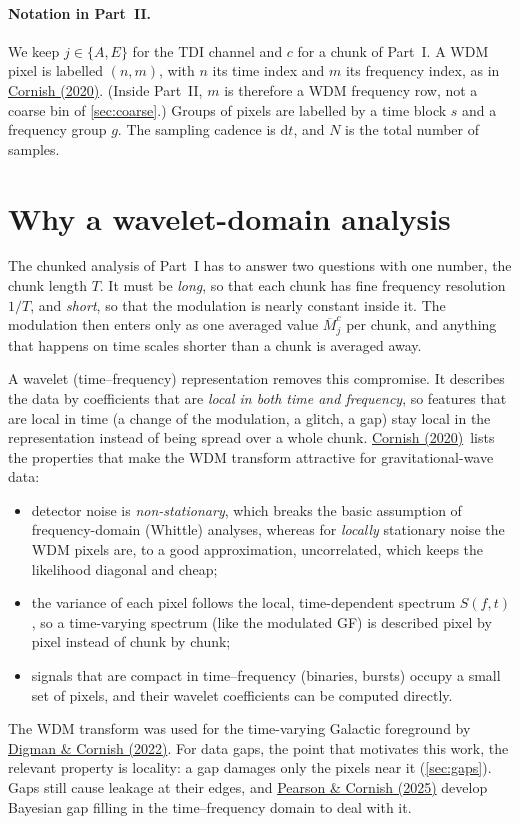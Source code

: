 \documentclass[11pt,a4paper]{article}
\newcommand{\urlCornish}{https://arxiv.org/abs/2009.00043}
\newcommand{\Cornish}{\href{\urlCornish}{Cornish (2020)}}
\newcommand{\dd}{\mathrm{d}}
\newcommand{\Mbar}{\overline{M}}
\begin{document}
\paragraph{Notation in Part~II.} We keep $j\in\{A,E\}$ for the TDI channel and $c$ for
a chunk of Part~I. A WDM pixel is labelled $(n,m)$, with $n$ its time index and $m$
its frequency index, as in \Cornish. (Inside Part~II, $m$ is therefore a WDM frequency
row, not a coarse bin of \cref{sec:coarse}.) Groups of pixels are labelled by a time
block $s$ and a frequency group $g$. The sampling cadence is $\dd t$, and
$N$ is the total number of samples.

\section{Why a wavelet-domain analysis}\label{sec:why}

The chunked analysis of Part~I has to answer two questions with one number, the chunk
length $T$. It must be \emph{long}, so that each chunk has fine frequency resolution
$1/T$, and \emph{short}, so that the modulation is nearly constant inside it. The
modulation then enters only as one averaged value $\Mbar^c_j$ per chunk, and anything
that happens on time scales shorter than a chunk is averaged away.

A wavelet (time--frequency) representation removes this compromise. It describes the
data by coefficients that are \emph{local in both time and frequency}, so features
that are local in time (a change of the modulation, a glitch, a gap) stay local in the
representation instead of being spread over a whole chunk. \Cornish\ lists the
properties that make the WDM transform attractive for gravitational-wave data:
\begin{itemize}
  \item detector noise is \emph{non-stationary}, which breaks the basic assumption of
        frequency-domain (Whittle) analyses, whereas for \emph{locally} stationary
        noise the WDM pixels are, to a good approximation, uncorrelated, which keeps
        the likelihood diagonal and cheap;
  \item the variance of each pixel follows the local, time-dependent spectrum
        $S(f,t)$, so a time-varying spectrum (like the modulated GF) is described
        pixel by pixel instead of chunk by chunk;
  \item signals that are compact in time--frequency (binaries, bursts) occupy a small
        set of pixels, and their wavelet coefficients can be computed directly.
\end{itemize}
The WDM transform was used for the time-varying Galactic foreground by
\href{https://arxiv.org/abs/2212.04600}{Digman \& Cornish (2022)}. For data gaps, the
point that motivates this work, the relevant property is locality: a gap damages only
the pixels near it (\cref{sec:gaps}). Gaps still cause leakage at their edges, and
\href{https://arxiv.org/abs/2509.05479}{Pearson \& Cornish (2025)} develop Bayesian
gap filling in the time--frequency domain to deal with it.
\end{document}
